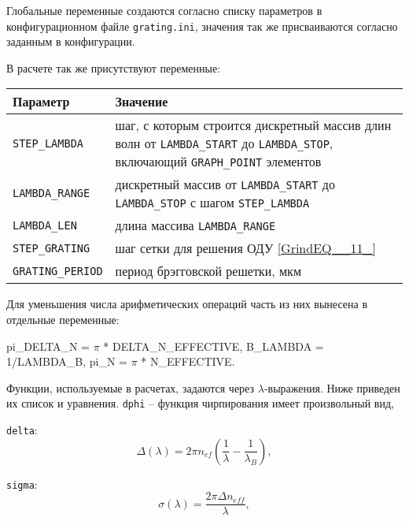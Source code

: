 Глобальные переменные создаются согласно списку параметров в конфигурационном файле \texttt{grating.ini}, значения так же присваиваются согласно заданным в конфигурации.

В расчете так же присутствуют переменные:

\vspace{1em}
\renewcommand{\arraystretch}{1.4}
\begin{tabular}{|l|p{300pt}|}
\hline
Параметр & Значение \\
\hline
\hline
\texttt{STEP\_LAMBDA} & шаг, с которым строится дискретный массив длин волн от \texttt{LAMBDA\_START} до \texttt{LAMBDA\_STOP}, включающий \texttt{GRAPH\_POINT} элементов \\
\hline
\texttt{LAMBDA\_RANGE} & дискретный массив от \texttt{LAMBDA\_START} до \texttt{LAMBDA\_STOP} с шагом \texttt{STEP\_LAMBDA} \\
\hline
\texttt{LAMBDA\_LEN} & длина массива \texttt{LAMBDA\_RANGE} \\
\hline
\texttt{STEP\_GRATING} & шаг сетки для решения ОДУ \eqref{GrindEQ__11_} \\
\hline
\texttt{GRATING\_PERIOD} & период брэгговской решетки, мкм \\
\hline
\end{tabular}
\vspace{1em}

Для уменьшения числа арифметических операций часть из них вынесена в отдельные переменные:

\noindent pi\_DELTA\_N = $\pi $ * DELTA\_N\_EFFECTIVE,
\noindent B\_LAMBDA = 1/LAMBDA\_B,
\noindent pi\_N = $\pi $ * N\_EFFECTIVE.

Функции, используемые в расчетах, задаются через $\lambda$-выражения. Ниже приведен их список и уравнения.
\newline
\newline
\noindent \texttt{dphi} -- функция чирпирования имеет произвольный вид,

\noindent \texttt{delta}:
\begin{equation} \label{GrindEQ__10_1_}
\Delta \left(\lambda \right)=2\pi n_{ef}\left(\frac{1}{\lambda }-\frac{1}{{\lambda }_B}\right),
\end{equation}

\noindent \texttt{sigma}:
\begin{equation} \label{GrindEQ__10_2_}
\sigma \left(\lambda \right)=\frac{2\pi \Delta n_{eff}}{\lambda },
\end{equation}

